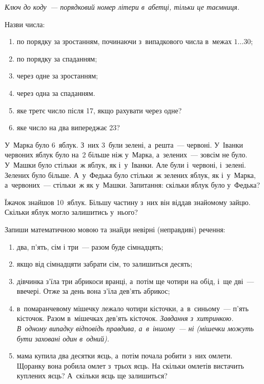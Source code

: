 \emph{
Ключ до коду~--- порядковий номер літери в~абетці, тільки це таємниця.
}


\problem
Назви числа:
\begin{enumerate}
    \item по порядку за зростанням, починаючи з~випадкового числа
    в~межах $1\ldots30$;
    \item по порядку за спаданням;
    \item через одне за зростанням;
    \item через одна за спаданням.
    \item яке третє число після 17, якщо рахувати через одне?
    \item яке число на два випереджає 23?
\end{enumerate}


\problem
У~Марка було 6~яблук. З~них 3~були зелені, а~решта~--- червоні.
У~Іванки червоних яблук було на~2 більше ніж у~Марка,
а~зелених~--- зовсім не було.
У~Машки було стільки~ж яблук, як і~у~Іванки.
Але були і~червоні, і~зелені. Зелених було більше.
А~у~Федька було стільки~ж зелених яблук, як і~у~Марка,
а~червоних~--- стільки~ж як у~Машки.
Запитання: скільки яблук було у~Федька?


\problem
Їжачок знайшов 10~яблук.
Більшу частину з~них він віддав знайомому зайцю.
Скільки яблук могло залишитись у~нього?


\problem
Запиши математичною мовою та знайди невірні (неправдиві) речення:
\begin{enumerate}
    \item два, п'ять, сім і три~--- разом буде сімнадцять;
    \item якщо від сімнадцяти забрати сім, то залишиться десять;
    \item дівчинка з'їла три абрикоси вранці, а~потім ще чотири на обід,
    і~ще дві~--- ввечері. Отже за день вона з'їла дев'ять абрикос;
    \item в~помаранчевому мішечку лежало чотири кісточки,
    а~в~синьому~--- п'ять кісточок. Разом в~мішечках дев'ять кісточок.
    \emph{Завдання з~хитринкою. В~одному випадку відповідь правдива,
    а~в~іншому~--- ні (мішечки можуть бути заховані один в~одний).}
    \item мама купила два десятки яєць, а~потім почала робити з~них омлети.
    Щоранку вона робила омлет з~трьох яєць.
    На скільки омлетів вистачить куплених яєць? А~скільки яєць ще залишиться?
\end{enumerate}


